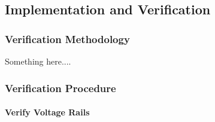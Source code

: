 \subsection{Implementation and Verification} %
\label{sub:controller_implementation_and_verification}


\subsubsection{Verification Methodology} %
Something here....


\subsubsection{Verification Procedure} %
\label{ssub:verification_procedure}

\paragraph{Verify Voltage Rails} %
 \label{par:verify_voltage_rails}

